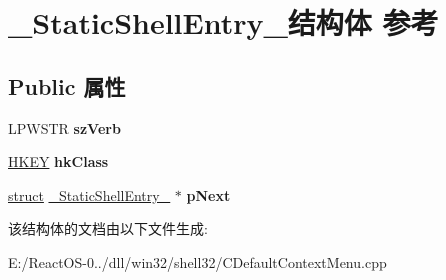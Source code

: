 \hypertarget{struct___static_shell_entry__}{}\section{\+\_\+\+Static\+Shell\+Entry\+\_\+结构体 参考}
\label{struct___static_shell_entry__}
\subsection*{Public 属性}
\begin{DoxyCompactItemize}
\item 
\mbox{\label{struct___static_shell_entry___ad81882c863585f973094acee05f0f5e1}} 
L\+P\+W\+S\+TR {\bfseries sz\+Verb}
\item 
\mbox{\label{struct___static_shell_entry___a25ce9f60b1c37152a0d18e54f688cddf}} 
\hyperlink{interfacevoid}{H\+K\+EY} {\bfseries hk\+Class}
\item 
\mbox{\label{struct___static_shell_entry___a470b2daa050824406b660c2dc0254093}} 
\hyperlink{interfacestruct}{struct} \hyperlink{struct___static_shell_entry__}{\+\_\+\+Static\+Shell\+Entry\+\_\+} $\ast$ {\bfseries p\+Next}
\end{DoxyCompactItemize}


该结构体的文档由以下文件生成\+:\begin{DoxyCompactItemize}
\item 
E\+:/\+React\+O\+S-\/0../dll/win32/shell32/C\+Default\+Context\+Menu.\+cpp\end{DoxyCompactItemize}
